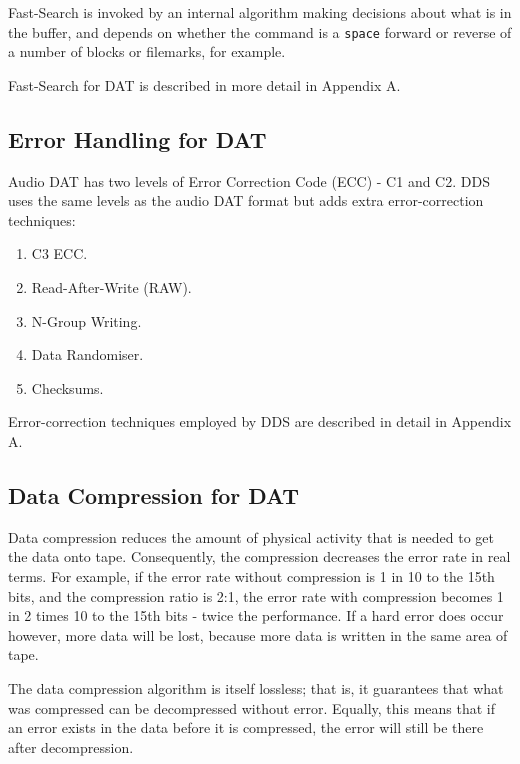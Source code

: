 Fast-Search is invoked by an internal algorithm making decisions about what
is in the buffer, and depends on whether the command is a {\tt space} forward
or reverse of a number of blocks or filemarks, for example.

Fast-Search for DAT is described in more detail in Appendix A.

\subsection {Error Handling for DAT}

Audio DAT has two levels of Error Correction Code (ECC) - C1 and C2. DDS
uses the same levels as the audio DAT format but adds extra error-correction
techniques:

\begin {enumerate}

\item C3 ECC.

\item Read-After-Write (RAW).

\item N-Group Writing.

\item Data Randomiser.

\item Checksums.

\end {enumerate}

Error-correction techniques employed by DDS are described in detail in
Appendix A.

\subsection {Data Compression for DAT}

Data compression reduces the amount of physical activity that is needed to
get the data onto tape. Consequently, the compression decreases the error
rate in real terms. For example, if the error rate without compression is
1 in 10 to the 15th bits, and the compression ratio is 2:1, the error rate
with compression becomes 1 in 2 times 10 to the 15th bits - twice the
performance. If a hard error does occur however, more data will be lost,
because more data is written in the same area of tape.

The data compression algorithm is itself lossless; that is, it guarantees
that what was compressed can be decompressed without error. Equally, this
means that if an error exists in the data before it is compressed, the error
will still be there after decompression.

